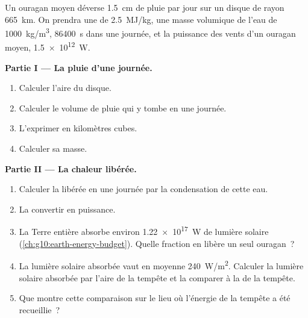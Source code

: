\begin{problem}
\label{pb:g10:storms-and-cyclones:1}
Un ouragan moyen déverse \qty{1.5}{cm} de pluie par jour sur un disque de
rayon \qty{665}{km}. On prendra une  de \qty{2.5}{MJ/kg},
une masse volumique de l'eau de \qty{1000}{kg/m^3}, \qty{86400}{s} dans une
journée, et la puissance des vents d'un ouragan moyen, \qty{1.5e12}{W}.

\medskip
\noindent\textbf{Partie I --- La pluie d'une journée.}
\begin{enumerate}
  \item Calculer l'aire du disque.
  \item Calculer le volume de pluie qui y tombe en une journée.
  \item L'exprimer en kilomètres cubes.
  \item Calculer sa masse.
\end{enumerate}

\medskip
\noindent\textbf{Partie II --- La chaleur libérée.}
\begin{enumerate}[resume]
  \item Calculer la  libérée en une journée par la
        condensation de cette eau.
  \item La convertir en puissance.
  \item La Terre entière absorbe environ \qty{1.22e17}{W} de lumière
        solaire (\cref{ch:g10:earth-energy-budget}). Quelle fraction en
        libère un seul ouragan~?
  \item La lumière solaire absorbée vaut en moyenne \qty{240}{W/m^2}.
        Calculer la lumière solaire absorbée par l'aire de la tempête et la
        comparer à la  de la tempête.
  \item Que montre cette comparaison sur le lieu où l'énergie de la tempête
        a été recueillie~?
\end{enumerate}


\end{problem}
